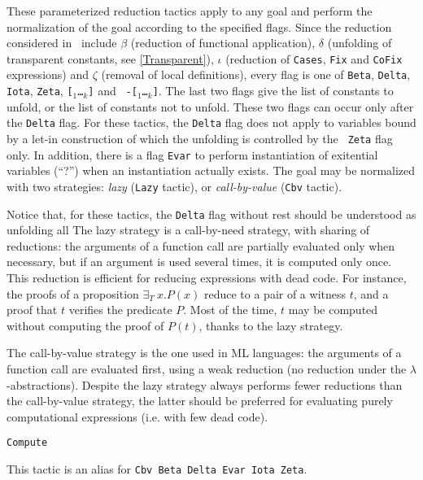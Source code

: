 These parameterized reduction tactics apply to any goal and perform
the normalization of the goal according to the specified flags. Since
the reduction considered in \Coq\ include $\beta$ (reduction of
functional application), $\delta$ (unfolding of transparent constants,
see \ref{Transparent}), $\iota$ (reduction of {\tt Cases}, {\tt Fix}
and {\tt CoFix} expressions) and $\zeta$ (removal of local
definitions), every flag is one of {\tt Beta}, {\tt Delta}, {\tt
  Iota}, {\tt Zeta}, {\tt [\qualid$_1$\ldots\qualid$_k$]} and {\tt
  -[\qualid$_1$\ldots\qualid$_k$]}.  The last two flags give the list
of constants to unfold, or the list of constants not to unfold. These
two flags can occur only after the {\tt Delta} flag.  For these
tactics, the {\tt Delta} flag does not apply to variables bound by a
let-in construction of which the unfolding is controlled by the {\tt
  Zeta} flag only.  In addition, there is a flag {\tt Evar} to perform
instantiation of exitential variables (``?'') when an instantiation
actually exists.  The goal may be normalized with two strategies: {\em
  lazy} ({\tt Lazy} tactic), or {\em call-by-value} ({\tt Cbv}
tactic).

Notice that, for these tactics, the {\tt Delta} flag without rest
should be understood as unfolding all The lazy strategy is a
call-by-need strategy, with sharing of reductions: the arguments of a
function call are partially evaluated only when necessary, but if an
argument is used several times, it is computed only once. This
reduction is efficient for reducing expressions with dead code. For
instance, the proofs of a proposition $\exists_T ~x. P(x)$ reduce to a
pair of a witness $t$, and a proof that $t$ verifies the predicate
$P$. Most of the time, $t$ may be computed without computing the proof
of $P(t)$, thanks to the lazy strategy.

The call-by-value strategy is the one used in ML languages: the
arguments of a function call are evaluated first, using a weak
reduction (no reduction under the $\lambda$-abstractions). Despite the
lazy strategy always performs fewer reductions than the call-by-value
strategy, the latter should be preferred for evaluating purely
computational expressions (i.e. with few dead code).

\begin{Variants}
\item {\tt Compute}  
  
  This tactic is an alias for {\tt Cbv Beta Delta Evar Iota Zeta}.
\end{Variants}

